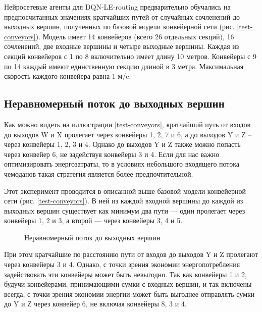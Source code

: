 \documentclass[specification,annotation,times]{itmo-student-thesis}
\theoremstyle{definition}
\begin{document}
Нейросетевые агенты для DQN-LE-routing предварительно обучались на
предпосчитанных значениях кратчайших путей от случайных сочленений до выходных вершин,
полученных по базовой модели конвейерной сети (рис. \ref{test-conveyors}).
Модель имеет 14 конвейеров (всего 26 отдельных секций), 16 сочленений, две
входные вершины и четыре выходные вершины. Каждая из секций конвейеров с 1 по 8
включительно имеет длину 10 метров. Конвейеры с 9 по 14 каждый имеют
единственную секцию длиной в 3 метра. Максимальная скорость каждого конвейера
равна 1 м/c.

\subsection{Неравномерный поток до выходных вершин}

Как можно видеть на иллюстрации \ref{test-conveyors}, кратчайший путь от входов
до выходов W и X пролегает через конвейеры 1, 2, 7 и 6, а до выходов Y и Z --
через конвейеры 1, 2, 3 и 4. Однако до выходов Y и Z также можно попасть через
конвейер 6, не задействуя конвейеры 3 и 4. Если для нас важно оптимизировать
энергозатраты, то в условиях небольшого входящего потока чемоданов такая
стратегия является более предпочтительной.

Этот эксперимент проводится в описанной выше базовой модели конвейерной сети
(рис. \ref{test-conveyors}). В ней из каждой входной вершины до каждой из
выходных вершин существует как минимум два пути --- один пролегает через
конвейеры 1, 2 и 3, а второй --- через конвейеры 3, 4 и 5.

\begin{figure}[!h]
  \centering
  \hfil
  \caption{Неравномерный поток до выходных вершин}\label{experiments:conveyors:1}
\end{figure}

При этом кратчайшие по расстоянию пути от входов до выходов Y и Z пролегают
через конвейеры 3 и 4. Однако, с точки зрения экономии энергопотребления
задействовать эти конвейеры может быть невыгодно. Так как конвейеры 1 и 2,
будучи конвейерами, принимающими сумки с входных вершин, и так включены всегда,
с точки зрения экономии энергии может быть выгоднее отправлять сумки до Y и Z
через конвейер 6, не включая конвейеры 8, 3 и 4.
\end{document}
